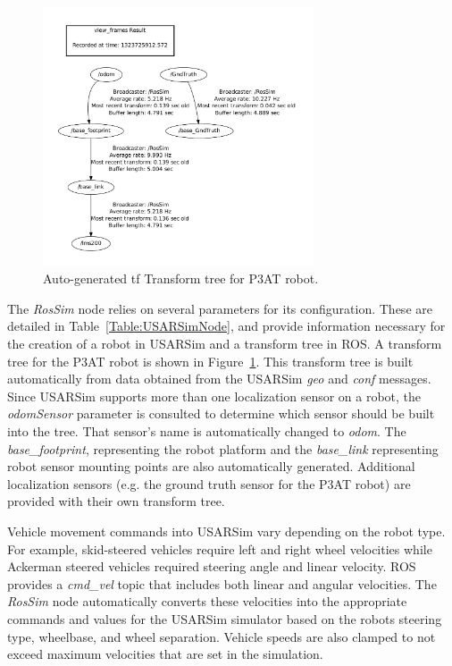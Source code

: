 \begin{figure}[t!]
\centering
\includegraphics[width=8cm]{Figures/ROS/P3ATFrames.pdf}
\caption{Auto-generated tf Transform tree for P3AT robot.}
\label{Fig:P3ATTransformTree}
\end{figure}

The {\it RosSim} node relies on several parameters for its configuration. These are detailed in Table~\ref{Table:USARSimNode}, and provide information necessary for the creation of a robot in USARSim and a transform tree in ROS. A transform tree for the P3AT robot is shown in Figure~\ref{Fig:P3ATTransformTree}. This transform tree is built automatically from data obtained from the USARSim {\it geo} and {\it conf} messages. Since USARSim supports more than one localization sensor on a robot, the {\it odomSensor} parameter is consulted to determine which sensor should be built into the tree. That sensor's name is automatically changed to {\it odom}. The {\it base\_footprint}, representing the robot platform and the {\it base\_link} representing robot sensor mounting points are also automatically generated. Additional localization sensors (e.g. the ground truth sensor for the P3AT robot) are provided with their own transform tree.

Vehicle movement commands into USARSim vary depending on the robot type. For example, skid-steered vehicles require left and right wheel velocities while Ackerman steered vehicles required steering angle and linear velocity. ROS provides a {\it cmd\_vel} topic that includes both linear and angular velocities. The {\it RosSim} node automatically converts these velocities into the appropriate commands and values for the USARSim simulator based on the robots steering type, wheelbase, and wheel separation. Vehicle speeds are also clamped to not exceed maximum velocities that are set in the simulation.

